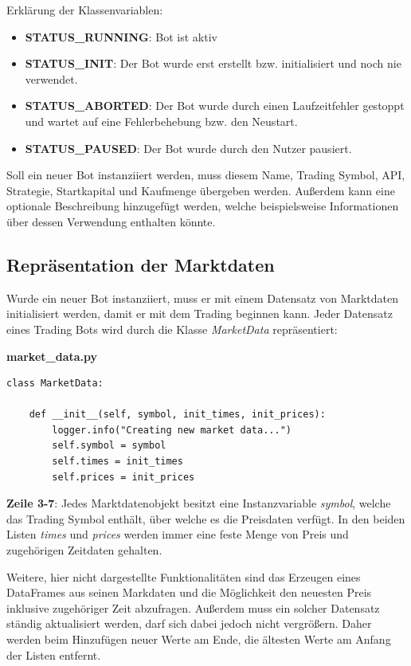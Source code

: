 \documentclass[oneside]{ausarbeitung}
\begin{document}
Erklärung der Klassenvariablen:
\begin{itemize}
	\item \textbf{STATUS\_RUNNING}: Bot ist aktiv
	\item \textbf{STATUS\_INIT}: Der Bot wurde erst erstellt bzw. initialisiert
		und noch nie verwendet.
	\item \textbf{STATUS\_ABORTED}: Der Bot wurde durch einen Laufzeitfehler
		gestoppt und wartet auf eine Fehlerbehebung bzw. den Neustart.
	\item \textbf{STATUS\_PAUSED}: Der Bot wurde durch den Nutzer pausiert.
\end{itemize}

Soll ein neuer Bot instanziiert werden, muss diesem Name, Trading Symbol, API, Strategie, Startkapital und Kaufmenge übergeben werden. Außerdem kann eine optionale Beschreibung hinzugefügt werden, welche beispielsweise Informationen über dessen Verwendung enthalten könnte.

\subsection{Repräsentation der Marktdaten}
\label{sub:repräsentation_der_marktdaten}

Wurde ein neuer Bot instanziiert, muss er mit einem Datensatz von Marktdaten initialisiert werden, damit er mit dem Trading beginnen kann. Jeder Datensatz eines Trading Bots wird durch die Klasse \textit{MarketData} repräsentiert:

\lstset{language=Python}
\lstset{frame=lines}
\lstset{basicstyle=\footnotesize}
\textbf{market\_data.py}
\begin{lstlisting}
class MarketData:

	def __init__(self, symbol, init_times, init_prices):
		logger.info("Creating new market data...")
		self.symbol = symbol
		self.times = init_times
		self.prices = init_prices
\end{lstlisting}

\textbf{Zeile 3-7}: Jedes Marktdatenobjekt besitzt eine Instanzvariable \textit{symbol}, welche das Trading Symbol enthält, über welche es die Preisdaten verfügt. In den beiden Listen \textit{times} und \textit{prices} werden immer eine feste Menge von Preis und zugehörigen Zeitdaten gehalten.

Weitere, hier nicht dargestellte Funktionalitäten sind das Erzeugen eines DataFrames aus seinen Markdaten und die Möglichkeit den neuesten Preis inklusive zugehöriger Zeit abzufragen. Außerdem muss ein solcher Datensatz ständig aktualisiert werden, darf sich dabei jedoch nicht vergrößern. Daher werden beim Hinzufügen neuer Werte am Ende, die ältesten Werte am Anfang der Listen entfernt.
\end{document}

